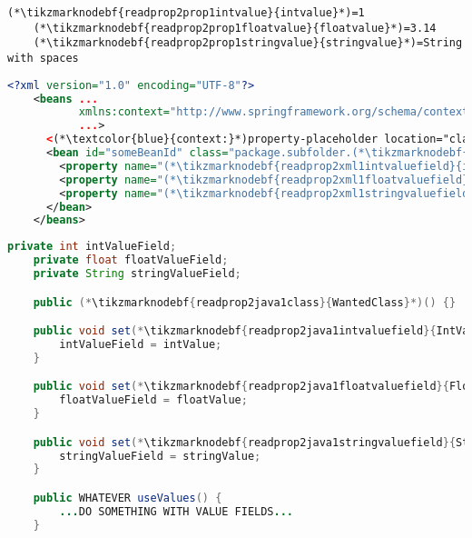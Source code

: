 \enlargethispage{10mm}
\begin{lstlisting}[title={A \path{.properties} file called \tikzmarknodebf{readprop2prop1filename}{\textit{setters.properties}}}]
    (*\tikzmarknodebf{readprop2prop1intvalue}{intvalue}*)=1
    (*\tikzmarknodebf{readprop2prop1floatvalue}{floatvalue}*)=3.14
    (*\tikzmarknodebf{readprop2prop1stringvalue}{stringvalue}*)=String with spaces
\end{lstlisting}
\begin{lstlisting}[language=XML, title={Configuration XML}]
    <?xml version="1.0" encoding="UTF-8"?>
    <beans ...
           xmlns:context="http://www.springframework.org/schema/context"
           ...>
      <(*\textcolor{blue}{context:}*)property-placeholder location="classpath:(*\tikzmarknodebf{readprop2xml1filename}{setter.properties}[ForestGreen]*)" file-encoding="utf-8"/>
      <bean id="someBeanId" class="package.subfolder.(*\tikzmarknodebf{readprop2xml1class}{WantedClass}[ForestGreen]*)">
        <property name="(*\tikzmarknodebf{readprop2xml1intvaluefield}{intValueField}[ForestGreen]*)" value="(*\textcolor{ForestGreen}{\$\{}\tikzmarknodebf{readprop2xml1intvalue}{intvalue}[ForestGreen]\textcolor{ForestGreen}{\}}*)"/>
        <property name="(*\tikzmarknodebf{readprop2xml1floatvaluefield}{floatValueField}[ForestGreen]*)" value="(*\textcolor{ForestGreen}{\$\{}\tikzmarknodebf{readprop2xml1floatvalue}{floatvalue}[ForestGreen]\textcolor{ForestGreen}{\}}*)"/>
        <property name="(*\tikzmarknodebf{readprop2xml1stringvaluefield}{stringValueField}[ForestGreen]*)" value="(*\textcolor{ForestGreen}{\$\{}\tikzmarknodebf{readprop2xml1stringvalue}{stringvalue}[ForestGreen]\textcolor{ForestGreen}{\}}*)"/>
      </bean>
    </beans>
\end{lstlisting}
\begin{lstlisting}[language=Java, title={Wanted class with the zero--parameter constructor and setter methods}]
    private int intValueField;
    private float floatValueField;
    private String stringValueField;

    public (*\tikzmarknodebf{readprop2java1class}{WantedClass}*)() {}

    public void set(*\tikzmarknodebf{readprop2java1intvaluefield}{IntValueField}*)(int intValue) {
        intValueField = intValue;
    }

    public void set(*\tikzmarknodebf{readprop2java1floatvaluefield}{FloatValueField}*)(float floatValue) {
        floatValueField = floatValue;
    }

    public void set(*\tikzmarknodebf{readprop2java1stringvaluefield}{StringValueField}*)(string stringValue) {
        stringValueField = stringValue;
    }

    public WHATEVER useValues() {
        ...DO SOMETHING WITH VALUE FIELDS...
    }
\end{lstlisting}
